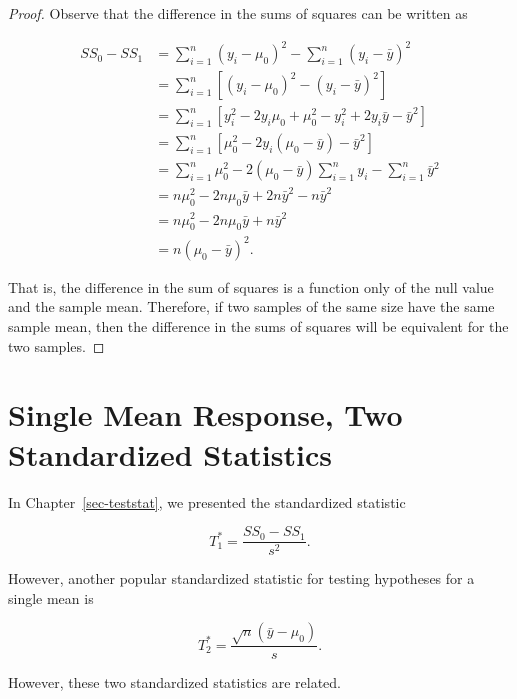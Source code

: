 \documentclass[
  letterpaper,
  DIV=11,
  numbers=noendperiod]{scrreprt}
\theoremstyle{definition}
\theoremstyle{definition}
\theoremstyle{plain}
\theoremstyle{remark}
\begin{document}
\begin{proof}

Observe that the difference in the sums of squares can be written as

\[
\begin{aligned}
  SS_0 - SS_1 
    &= \sum_{i=1}^{n} \left(y_i - \mu_0\right)^2 - \sum_{i=1}^{n} \left(y_i - \bar{y}\right)^2 \\
    &= \sum_{i=1}^{n} \left[\left(y_i - \mu_0\right)^2 - \left(y_i - \bar{y}\right)^2\right] \\
    &= \sum_{i=1}^{n} \left[y_i^2 - 2y_i \mu_0 + \mu_0^2 - y_i^2 + 2y_i \bar{y} - \bar{y}^2\right] \\
    &= \sum_{i=1}^{n} \left[\mu_0^2 - 2y_i \left(\mu_0 - \bar{y}\right) - \bar{y}^2\right] \\
    &= \sum_{i=1}^{n} \mu_0^2 - 2\left(\mu_0 - \bar{y}\right)\sum_{i=1}^{n} y_i - \sum_{i=1}^{n} \bar{y}^2 \\
    &= n\mu_0^2 - 2n\mu_0 \bar{y} + 2n\bar{y}^2 - n\bar{y}^2 \\
    &= n\mu_0^2 - 2n\mu_0 \bar{y} + n\bar{y}^2 \\
    &= n \left(\mu_0 - \bar{y}\right)^2.
\end{aligned}
\]

That is, the difference in the sum of squares is a function only of the
null value and the sample mean. Therefore, if two samples of the same
size have the same sample mean, then the difference in the sums of
squares will be equivalent for the two samples.

\end{proof}

\hypertarget{single-mean-response-two-standardized-statistics}{%
\section{Single Mean Response, Two Standardized
Statistics}\label{single-mean-response-two-standardized-statistics}}

In Chapter~\ref{sec-teststat}, we presented the standardized statistic

\[T_1^* = \frac{SS_0 - SS_1}{s^2}.\]

However, another popular standardized statistic for testing hypotheses
for a single mean is

\[T_2^* = \frac{\sqrt{n} \left(\bar{y} - \mu_0\right)}{s}.\]

However, these two standardized statistics are related.
\end{document}
